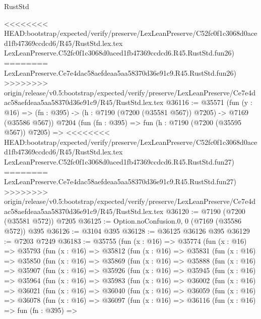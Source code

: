 \begin{lexlean}{RustStd}
\begin{coremodule}
{\begin{coremodule}
{{{{{{{{{{{{{{{{{{{{{{{{{{{{{{{{<<<<<<<< HEAD:bootstrap/expected/verify/preserve/LexLeanPreserve/C52fc0f1c3068d0aced1fb47369ccdcd6/R45/RustStd.lex.tex
    LexLeanPreserve.C52fc0f1c3068d0aced1fb47369ccdcd6.R45.RustStd.fun26)
========
    LexLeanPreserve.Ce7e4dac58aefdeaa5aa58370d36e91c9.R45.RustStd.fun26)
>>>>>>>> origin/release/v0.5:bootstrap/expected/verify/preserve/LexLeanPreserve/Ce7e4dac58aefdeaa5aa58370d36e91c9/R45/RustStd.lex.tex
@36116 := @35571
    (fun (y : @16) => (fn : @395) -> (h : @7190 (@7200 (@35581 @567)) @7205) -> @7169 (@35586 @567))
    @7204
    (fun (fn : @395) =>
    fun (h : @7190 (@7200 (@35595 @567)) @7205) =>
<<<<<<<< HEAD:bootstrap/expected/verify/preserve/LexLeanPreserve/C52fc0f1c3068d0aced1fb47369ccdcd6/R45/RustStd.lex.tex
    LexLeanPreserve.C52fc0f1c3068d0aced1fb47369ccdcd6.R45.RustStd.fun27)
========
    LexLeanPreserve.Ce7e4dac58aefdeaa5aa58370d36e91c9.R45.RustStd.fun27)
>>>>>>>> origin/release/v0.5:bootstrap/expected/verify/preserve/LexLeanPreserve/Ce7e4dac58aefdeaa5aa58370d36e91c9/R45/RustStd.lex.tex
@36120 := @7190 (@7200 (@35581 @572)) @7205
@36125 := Option.noConfusion.{0, 0} (@7169 (@35586 @572)) @395
@36126 := @3104 @395
@36128 := @36125 @36126 @395
@36129 := @7203 @7249
@36183 := @35755
    (fun (x : @16) =>
    @35774
      (fun (x : @16) =>
      @35793
        (fun (x : @16) =>
        @35812
          (fun (x : @16) =>
          @35831
            (fun (x : @16) =>
            @35850
              (fun (x : @16) =>
              @35869
                (fun (x : @16) =>
                @35888
                  (fun (x : @16) =>
                  @35907
                    (fun (x : @16) =>
                    @35926
                      (fun (x : @16) =>
                      @35945
                        (fun (x : @16) =>
                        @35964
                          (fun (x : @16) =>
                          @35983
                            (fun (x : @16) =>
                            @36002
                              (fun (x : @16) =>
                              @36021
                                (fun (x : @16) =>
                                @36040
                                  (fun (x : @16) =>
                                  @36059
                                    (fun (x : @16) =>
                                    @36078
                                      (fun (x : @16) =>
                                      @36097
                                        (fun (x : @16) =>
                                        @36116
                                          (fun (x : @16) =>
                                          fun (fn : @395) =>
}}}}}}}}}}}}}}}}}}}}}}}}}}}}}}}}
\end{coremodule}}
\end{coremodule}
\end{lexlean}
